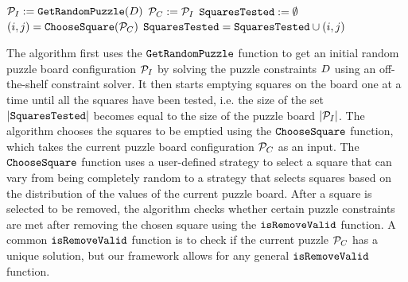 \begin{algorithm}[!htpb]
\caption{$\puzzlegen$($\puzzledecl$, $\puzzlecomplexity$, $\puzzletransformset$)}
\begin{algorithmic}[1]
\STATE $\mathcal{P}_I := \texttt{GetRandomPuzzle}(D)$
\STATE $\mathcal{P}_C := \mathcal{P}_I$
\STATE $\texttt{SquaresTested} := \emptyset$
\STATE{$\complexitydict := \{\}$}
\WHILE{$|\squarestested| \neq |\randomPuzzle|$}
\STATE $(i,j) = \texttt{ChooseSquare}(\mathcal{P}_C)$
\STATE $\texttt{SquaresTested} = \texttt{SquaresTested} \cup (i,j)$
\STATE {\[ \currentpuzzle'(k,l) = \left\{ 
  \begin{array}{l l}
    \currentpuzzle(k,l) & \quad \mbox{if $(k,l) \neq (i,j)$}\\
    \phi & \quad \mbox{if $(k,l) = (i,j)$}
  \end{array} \right.\]
}
\STATE{$\allpuzzles := \emptyset$}
\FOR{$\puzzletransform \in \puzzletransformset$}
\ENDFOR
\FOR{$\puzzleboard \in \allpuzzles$}
\STATE{$\complexitydict[h] := \complexitydict[h] \cup \puzzleboard$}
\ENDFOR
{}
\ENDIF
\ENDWHILE
\RETURN{$\complexitydict$}
\end{algorithmic}
\end{algorithm}


The algorithm first uses the $\texttt{GetRandomPuzzle}$ function to get an initial
random puzzle board configuration $\mathcal{P}_I$ by solving the
puzzle constraints $\puzzledecl$ using an off-the-shelf constraint
solver. It then starts emptying squares on the board one at a time
until all the squares have been tested, i.e. the size of the set
$|\texttt{SquaresTested}|$ becomes equal to the size of the puzzle board
$|\mathcal{P}_I|$. The algorithm chooses the squares to be emptied
using the $\texttt{ChooseSquare}$ function, which takes the current puzzle
board configuration $\mathcal{P}_C$ as an input. The $\texttt{ChooseSquare}$
function uses a user-defined strategy to select a square that can vary
from being completely random to a strategy that selects squares based
on the distribution of the values of the current puzzle board. After a
square is selected to be removed, the algorithm checks whether certain
puzzle constraints are met after removing the chosen square using the
$\texttt{isRemoveValid}$ function. A common $\texttt{isRemoveValid}$ function is to
check if the current puzzle $\mathcal{P}_C$ has a unique solution,
but our framework allows for any general $\texttt{isRemoveValid}$ function.


